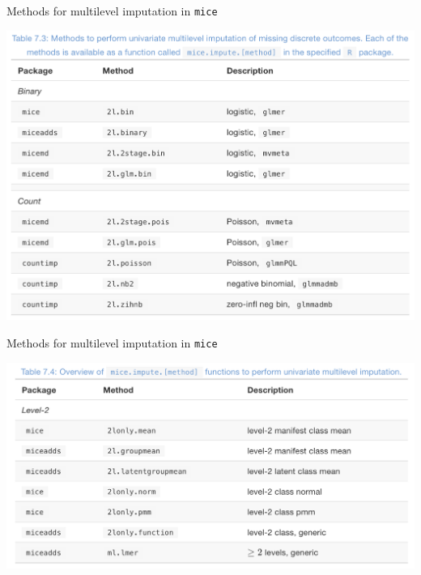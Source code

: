 \documentclass[ignorenonframetext,aspectratio=43]{beamer}
\begin{document}
\begin{frame}{Methods for multilevel imputation in \texttt{mice}}
\protect\hypertarget{methods-for-multilevel-imputation-in-mice-1}{}

\includegraphics{figures/fig3.png}

\end{frame}

\begin{frame}{Methods for multilevel imputation in \texttt{mice}}
\protect\hypertarget{methods-for-multilevel-imputation-in-mice-2}{}

\includegraphics{figures/fig2.png}

\end{frame}
\end{document}

